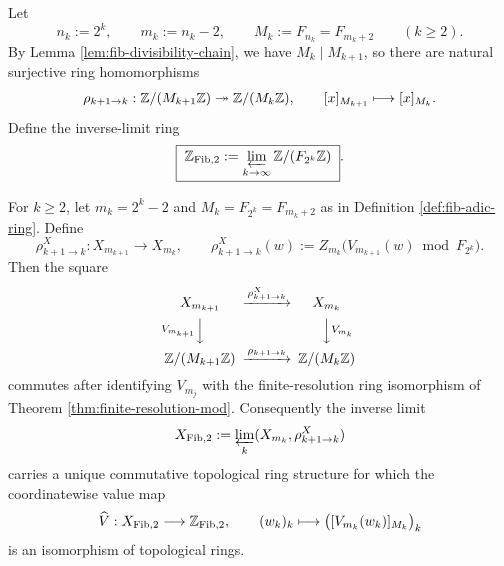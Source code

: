 \begin{definition}\label{def:fib-adic-ring}
Let
\[
n_k:=2^k,\qquad m_k:=n_k-2,\qquad M_k:=F_{n_k}=F_{m_k+2}\qquad(k\ge 2).
\]
By Lemma \ref{lem:fib-divisibility-chain}, we have \(M_k\mid M_{k+1}\), so there are natural surjective ring homomorphisms
\[
\rho_{k+1\to k}:\mathbb{Z}/(M_{k+1}\mathbb{Z})\twoheadrightarrow \mathbb{Z}/(M_k\mathbb{Z}),
\qquad
[x]_{M_{k+1}}\longmapsto [x]_{M_k}.
\]
Define the inverse-limit ring
\[
\boxed{\;
\mathbb{Z}_{\mathrm{Fib},2}:=\varprojlim_{k\to\infty}\mathbb{Z}/(F_{2^k}\mathbb{Z})
\;}.
\]
\end{definition}

\begin{proposition}\label{prop:transported-dyadic-stable-address-system}
For \(k\ge 2\), let \(m_k=2^k-2\) and \(M_k=F_{2^k}=F_{m_k+2}\) as in Definition \ref{def:fib-adic-ring}. Define
\[
\rho^X_{k+1\to k}:X_{m_{k+1}}\longrightarrow X_{m_k},
\qquad
\rho^X_{k+1\to k}(w):=Z_{m_k}\bigl(V_{m_{k+1}}(w)\bmod F_{2^k}\bigr).
\]
Then the square
\[
\begin{CD}
X_{m_{k+1}} @>{\rho^X_{k+1\to k}}>> X_{m_k}\\
@V{V_{m_{k+1}}}VV @VV{V_{m_k}}V\\
\ZZ/(M_{k+1}\ZZ) @>{\rho_{k+1\to k}}>> \ZZ/(M_k\ZZ)
\end{CD}
\]
commutes after identifying \(V_{m_j}\) with the finite-resolution ring isomorphism of Theorem \ref{thm:finite-resolution-mod}. Consequently the inverse limit
\[
X_{\mathrm{Fib},2}:=\varprojlim_k (X_{m_k},\rho^X_{k+1\to k})
\]
carries a unique commutative topological ring structure for which the coordinatewise value map
\[
\widehat V:X_{\mathrm{Fib},2}\longrightarrow \mathbb{Z}_{\mathrm{Fib},2},
\qquad
(w_k)_k\longmapsto \bigl([V_{m_k}(w_k)]_{M_k}\bigr)_k
\]
is an isomorphism of topological rings.
\end{proposition}


